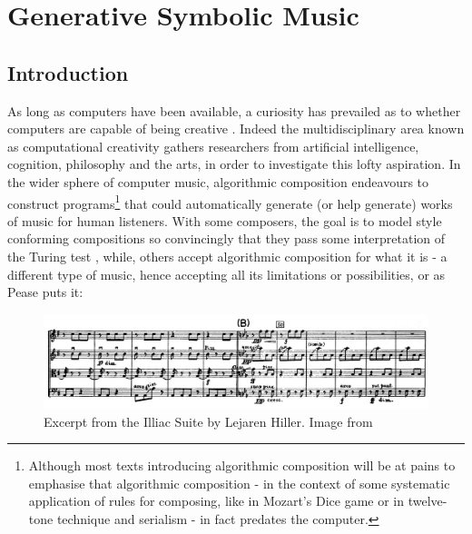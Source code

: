 \chapter{Generative Symbolic Music}
\label{chap:symbolic}

\section{Introduction}

As long as computers have been available, a curiosity has prevailed as to whether computers are capable of being creative \citep{Cardoso2009}. Indeed the multidisciplinary area known as computational creativity \citep{Boden1998, Wiggins2006, Boden2009a, Boden2009, Colton2012} gathers researchers from artificial intelligence, cognition, philosophy and the arts, in order to investigate this lofty aspiration. In the wider sphere of computer music, algorithmic composition \citep{Jacob1996, Fernandez2013} endeavours to construct programs\footnote{Although most texts introducing algorithmic composition will be at pains to emphasise that algorithmic composition - in the context of some systematic application of rules for composing, like in Mozart's Dice game or in twelve-tone technique and serialism - in fact predates the computer.} that could automatically generate (or help generate) works of music for human listeners. With some composers, the goal is to model style conforming compositions \citep{Cope1987, Cope1991} so convincingly that they pass some interpretation of the Turing test \citep{Ariza2009}, while, others accept algorithmic composition for what it is - a different type of music, hence accepting all its limitations or possibilities, or as Pease puts it:

\begin{figure}
	\begin{center}
		\includegraphics[width=\figSizeHundred]{ch03_symbolic/figures/illiac.jpg}
	\end{center}
	\caption[Excerpt from the Illiac Suite (Lejaren Hiller)]{Excerpt from the Illiac Suite by Lejaren Hiller. Image from \cite{Morgan2015}}
	\label{fig:illiac}
\end{figure}


